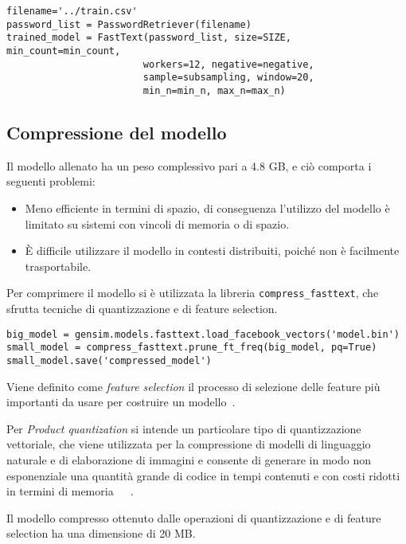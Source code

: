 \begin{verbatim}
filename='../train.csv'
password_list = PasswordRetriever(filename)
trained_model = FastText(password_list, size=SIZE, min_count=min_count,
                        workers=12, negative=negative,
                        sample=subsampling, window=20,
                        min_n=min_n, max_n=max_n)
\end{verbatim}

\subsection{Compressione del modello}
Il modello allenato ha un peso complessivo pari a 4.8 GB, e ciò comporta i seguenti problemi:
\begin{itemize}
    \item Meno efficiente in termini di spazio, di conseguenza l'utilizzo del modello è limitato su sistemi con vincoli di memoria o di spazio.
    \item È difficile utilizzare il modello in contesti distribuiti, poiché non è facilmente trasportabile.
\end{itemize}
Per comprimere il modello si è utilizzata la libreria \texttt{compress\_fasttext}, che sfrutta tecniche di quantizzazione e di feature selection.~\cite{compress-fasttext}
\begin{verbatim}
big_model = gensim.models.fasttext.load_facebook_vectors('model.bin')
small_model = compress_fasttext.prune_ft_freq(big_model, pq=True)
small_model.save('compressed_model')
\end{verbatim}

Viene definito come \emph{feature selection} il processo di selezione delle feature più importanti da usare per costruire un modello~\cite{feature}.

Per \emph{Product quantization} si intende un particolare tipo di quantizzazione vettoriale, che viene utilizzata per la compressione di modelli di linguaggio naturale e di elaborazione di immagini e consente di generare in modo non esponenziale una quantità grande di codice in tempi contenuti e con costi ridotti in termini di memoria~\cite{biijeta}~\cite{compress-fasttext}~\cite{quantization}.

Il modello compresso ottenuto dalle operazioni di quantizzazione e di feature selection ha una dimensione di 20 MB.
